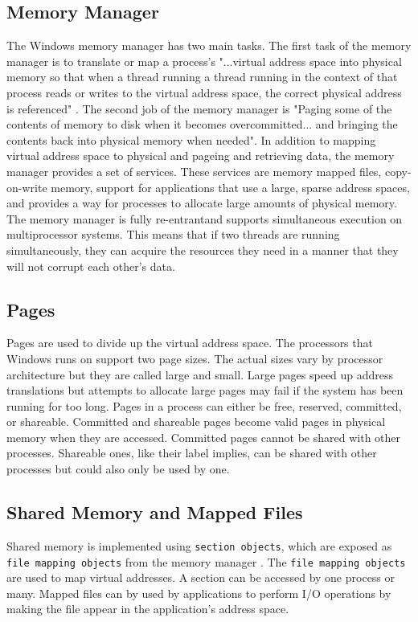 \subsection{Memory Manager}
The Windows memory manager has two main tasks. The first task of the memory manager is to translate or map a process's "...virtual address space into physical memory so that when a thread running a thread running in the context of that process reads or writes to the virtual address space, the correct physical address is referenced" \cite{WindowsText}. The second job of the memory manager is "Paging some of the contents of memory to disk when it becomes overcommitted... and bringing the contents back into physical memory when needed"\cite{WindowsText}. In addition to mapping virtual address space to physical and pageing and retrieving data, the memory manager provides a set of services. These services are memory mapped files, copy-on-write memory, support for applications that use a large, sparse address spaces, and provides a way for processes to allocate large amounts of physical memory\cite{WindowsText}. The memory manager is fully re-entrantand supports
simultaneous execution on multiprocessor systems\cite{WindowsText}. This means that if two threads are running simultaneously, they can acquire the resources they need in a manner that they will not corrupt each other's data.


\subsection{Pages}
Pages are used to divide up the virtual address space. The processors that Windows runs on support two page sizes. The actual sizes vary by processor architecture but they are called large and small\cite{WindowsText}. Large pages speed up address translations but attempts to allocate large pages may fail if the system has been running for too long. Pages in a process can either be free, reserved, committed, or shareable. Committed and shareable pages become valid pages in physical memory when they are accessed\cite{WindowsText}. Committed pages cannot be shared with other processes. Shareable ones, like their label implies, can be shared with other processes but could also only be used by one.

\subsection{Shared Memory and Mapped Files}
Shared memory is implemented using \lstinline{section objects}, which are exposed as \lstinline{file mapping objects} from the memory manager \cite{WindowsText}. The \lstinline{file mapping objects} are used to map virtual addresses. A section can be accessed by one process or many. Mapped files can by used by applications to perform I/O operations by making the file appear in the application's address space\cite{WindowsText}.
